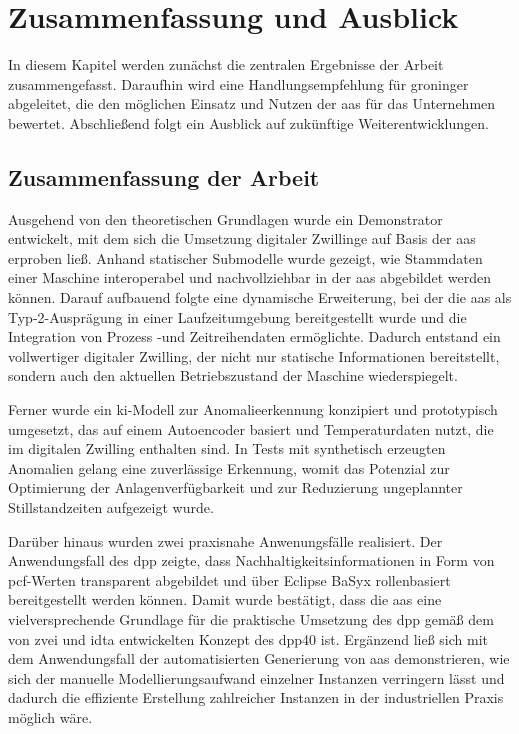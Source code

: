 \newpage
\section{Zusammenfassung und Ausblick}
\label{sec:Zusammenfassung}
In diesem Kapitel werden zunächst die zentralen Ergebnisse der Arbeit zusammengefasst.
Daraufhin wird eine Handlungsempfehlung für groninger abgeleitet, die den möglichen Einsatz und Nutzen der \acs{aas} für das Unternehmen bewertet.
Abschließend folgt ein Ausblick auf zukünftige Weiterentwicklungen.

\subsection{Zusammenfassung der Arbeit}
Ausgehend von den theoretischen Grundlagen wurde ein Demonstrator entwickelt, mit dem sich die Umsetzung digitaler Zwillinge auf Basis der \acs{aas} erproben ließ.
Anhand statischer Submodelle wurde gezeigt, wie Stammdaten einer Maschine interoperabel und nachvollziehbar in der \acs{aas} abgebildet werden können.
Darauf aufbauend folgte eine dynamische Erweiterung, bei der die \acs{aas} als Typ-2-Ausprägung in einer Laufzeitumgebung bereitgestellt wurde und die Integration von Prozess -und Zeitreihendaten ermöglichte.
Dadurch entstand ein vollwertiger digitaler Zwilling, der nicht nur statische Informationen bereitstellt, sondern auch den aktuellen Betriebszustand der Maschine wiederspiegelt.

Ferner wurde ein \acs{ki}-Modell zur Anomalieerkennung konzipiert und prototypisch umgesetzt, das auf einem Autoencoder basiert und Temperaturdaten nutzt, die im digitalen Zwilling enthalten sind.
In Tests mit synthetisch erzeugten Anomalien gelang eine zuverlässige Erkennung, womit das Potenzial zur Optimierung der Anlagenverfügbarkeit und zur Reduzierung ungeplannter Stillstandzeiten aufgezeigt wurde.

Darüber hinaus wurden zwei praxisnahe Anwenungsfälle realisiert.
Der Anwendungsfall des \acs{dpp} zeigte, dass Nachhaltigkeitsinformationen in Form von \acs{pcf}-Werten transparent abgebildet und über Eclipse BaSyx rollenbasiert bereitgestellt werden können.
Damit wurde bestätigt, dass die \acs{aas} eine vielversprechende Grundlage für die praktische Umsetzung des \acs{dpp} gemäß dem von \acs{zvei} und \acs{idta} entwickelten Konzept des \acs{dpp40} ist.
Ergänzend ließ sich mit dem Anwendungsfall der automatisierten Generierung von \acs{aas} demonstrieren, wie sich der manuelle Modellierungsaufwand einzelner Instanzen verringern lässt und dadurch die effiziente Erstellung zahlreicher Instanzen in der industriellen Praxis möglich wäre.

